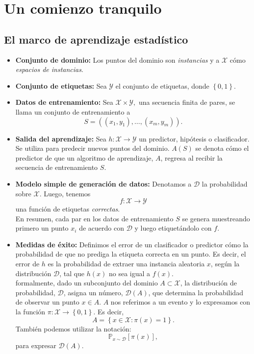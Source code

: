 \chapter{Un comienzo tranquilo}

\section{El marco de aprendizaje estadístico}

\begin{itemize}
    \item \textbf{Conjunto de dominio:} Los puntos del dominio son \textit{instancias} y a $\mathcal{X}$ cómo \textit{espacios de instancias}.
    \item \textbf{Conjunto de etiquetas:} Sea $\mathcal{Y}$ el conjunto de etiquetas, donde $\left\{0,1\right\}.$
    \item \textbf{Datos de entrenamiento:} Sea $\mathcal{X}\times \mathcal{Y},$ una secuencia finita de pares, se llama un conjunto de entrenamiento a
	$$S=\left((x_1,y_1),\ldots,(x_m,y_m)\right).$$
    \item \textbf{Salida del aprendizaje:} Sea $h:\mathcal{X}\to \mathcal{Y}$ un predictor, hipótesis o clasificador. Se utiliza para predecir nuevos puntos del dominio. $A(S)$ se denota cómo el predictor de que un algoritmo de aprendizaje, $A$, regresa al recibir la secuencia de entrenamiento $S$.
    \item \textbf{Modelo simple de generación de datos:} Denotamos a $\mathcal{D}$ la probabilidad sobre $\mathcal{X}$. Luego, tenemos 
	$$f:\mathcal{X}\to \mathcal{Y}$$ 
	una función de etiquetas \textit{correctas}. \\
	En resumen, cada par en los datos de entrenamiento $S$ se genera muestreando primero un punto $x_i$ de acuerdo con $\mathcal{D}$ y luego etiquetándolo con $f$.
    \item \textbf{Medidas de éxito:} Definimos el error de un clasificador o predictor cómo la probabilidad de que no prediga la etiqueta correcta en un punto. Es decir, el error de $h$ es la probabilidad de extraer una instancia aleatoria $x$, según la distribución $\mathcal{D}$, tal que $h(x)$ no sea igual a $f(x)$.\\
	formalmente, dado un subconjunto del dominio $A\subset \mathcal{X}$, la distribución de probabilidad, $\mathcal{D}$, asigna un número, $\mathcal{D}(A)$, que determina la probabilidad de observar un punto $x\in A$. $A$ nos referimos a un evento y lo expresamos con la función $\pi: \mathcal{X}\to \left\{0,1\right\}$. Es decir, 
	$$A=\left\{x\in \mathcal{X}: \pi(x)=1\right\}.$$
	También podemos utilizar la notación:
	$$\mathbb{P}_{x\sim\mathcal{D}} \left[\pi(x)\right],$$
	para expresar $\mathcal{D}(A).$\\


\end{itemize}
